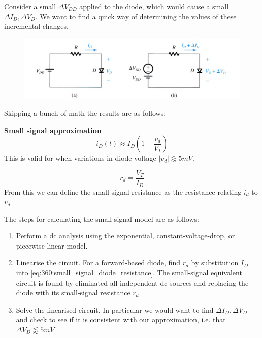 \documentclass[../notes.tex]{subfiles}
\begin{document}
Consider a small $ \Delta V_{DD} $ applied to the diode, which would cause a small $ \Delta I_D, \Delta V_D $.
We want to find a quick way of determining the values of these incremental changes.

\begin{figure}[H]
	\centering
	\includegraphics[width=0.8\linewidth]{img/image_2022-09-16-23-15-07.png}
\end{figure}

Skipping a bunch of math the results are as follows:

\begin{definition}
	\textbf{Small signal approximation}
	\begin{equation}
		i_D(t) \approx I_D (1+ \frac{v_d}{V_T} )
	\end{equation}
	This is valid for when variations in diode voltage $ |v_d| \lessapprox 5mV$.


	\begin{equation}
	 r_d = \frac{V_T}{I_D} 
	 \label{eq:360:small_signal_diode_resistance}
	\end{equation}
	From this we can define the small signal resistance as the resistance relating $ i_d $ to $ v_d $
	
\end{definition}



The steps for calculating the small signal model are as follows:

\begin{enumerate}
	\item Perform a dc analysis using the exponential, constant-voltage-drop, or piecewise-linear model.
	\item Linearise the circuit. For a forward-based diode, find $ r_d $ by substitution $ I_D $   into \eqref{eq:360:small_signal_diode_resistance}. The small-signal equivalent circuit is found by eliminated all independent dc sources and replacing the diode with its small-signal resistance $ r_d $ 
	\item Solve the linearised circuit. In particular we would want to find $ \Delta I_D, \Delta V_D $ and check to see if it is consistent with our approximation, i.e. that $ \Delta V_D \lessapprox 5mV $ 
\end{enumerate}
\end{document}
